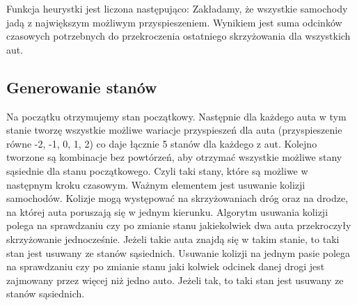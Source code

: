 \documentclass[../main.tex]{subfiles}
\begin{document}
Funkcja heurystki jest liczona następująco:
\newline
\newline
Zakładamy, że wszystkie samochody jadą z największym możliwym przyspieszeniem. Wynikiem jest suma odcinków czasowych potrzebnych do przekroczenia ostatniego skrzyżowania dla wszystkich aut.

\subsection{Generowanie stanów}

Na początku otrzymujemy stan początkowy. Następnie dla każdego auta w tym stanie tworzę wszystkie możliwe wariacje przyspieszeń dla auta (przyspieszenie równe -2, -1, 0, 1, 2) co daje łącznie 5 stanów dla każdego z aut. Kolejno tworzone są kombinacje bez powtórzeń, aby otrzymać wszystkie możliwe stany sąsiednie dla stanu początkowego. Czyli taki stany, które są możliwe w następnym kroku czasowym.
\newline
\newline
Ważnym elementem jest usuwanie kolizji samochodów. Kolizje mogą występować na skrzyżowaniach dróg oraz na drodze, na której auta poruszają się w jednym kierunku. Algorytm usuwania kolizji polega na sprawdzaniu czy po zmianie stanu jakiekolwiek dwa auta przekroczyły skrzyżowanie jednocześnie. Jeżeli takie auta znajdą się w takim stanie, to taki stan jest usuwany ze stanów sąsiednich. Usuwanie kolizji na jednym pasie polega na sprawdzaniu czy po zmianie stanu jaki kolwiek odcinek danej drogi jest zajmowany przez więcej niż jedno auto. Jeżeli tak, to taki stan jest usuwany ze stanów sąsiednich.
\end{document}

